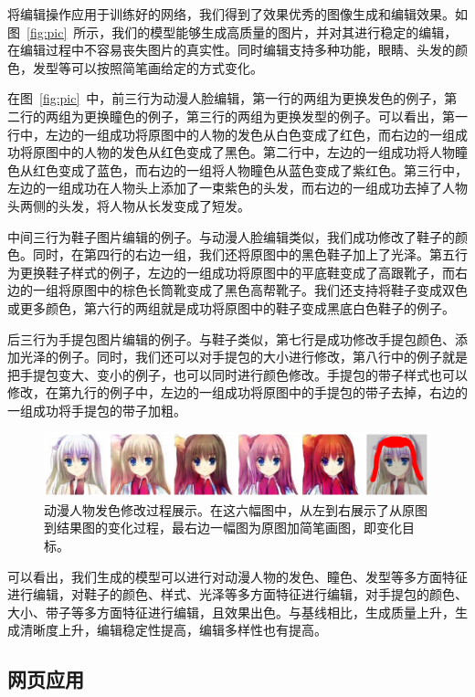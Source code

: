 \documentclass[a4paper,12pt,UTF8]{ctexart}
\newcommand{\kai}{\CJKfamily{zhkai}}	%
\begin{document}
将编辑操作应用于训练好的网络，我们得到了效果优秀的图像生成和编辑效果。如图~\ref{fig:pic}~所示，我们的模型能够生成高质量的图片，并对其进行稳定的编辑，在编辑过程中不容易丧失图片的真实性。同时编辑支持多种功能，眼睛、头发的颜色，发型等可以按照简笔画给定的方式变化。

在图~\ref{fig:pic}~中，前三行为动漫人脸编辑，第一行的两组为更换发色的例子，第二行的两组为更换瞳色的例子，第三行的两组为更换发型的例子。可以看出，第一行中，左边的一组成功将原图中的人物的发色从白色变成了红色，而右边的一组成功将原图中的人物的发色从红色变成了黑色。第二行中，左边的一组成功将人物瞳色从红色变成了蓝色，而右边的一组将人物瞳色从蓝色变成了紫红色。第三行中，左边的一组成功在人物头上添加了一束紫色的头发，而右边的一组成功去掉了人物头两侧的头发，将人物从长发变成了短发。

中间三行为鞋子图片编辑的例子。与动漫人脸编辑类似，我们成功修改了鞋子的颜色。同时，在第四行的右边一组，我们还将原图中的黑色鞋子加上了光泽。第五行为更换鞋子样式的例子，左边的一组成功将原图中的平底鞋变成了高跟靴子，而右边的一组将原图中的棕色长筒靴变成了黑色高帮靴子。我们还支持将鞋子变成双色或更多颜色，第六行的两组就是成功将原图中的鞋子变成黑底白色鞋子的例子。

后三行为手提包图片编辑的例子。与鞋子类似，第七行是成功修改手提包颜色、添加光泽的例子。同时，我们还可以对手提包的大小进行修改，第八行中的例子就是把手提包变大、变小的例子，也可以同时进行颜色修改。手提包的带子样式也可以修改，在第九行的例子中，左边的一组成功将原图中的手提包的带子去掉，右边的一组成功将手提包的带子加粗。

\begin{figure}[H]
  \centering
  \includegraphics[width=0.9\linewidth]{figs/pic6.png}
  \caption{\kai 动漫人物发色修改过程展示。在这六幅图中，从左到右展示了从原图到结果图的变化过程，最右边一幅图为原图加简笔画图，即变化目标。}
  \label{fig:pic6}
\end{figure}

可以看出，我们生成的模型可以进行对动漫人物的发色、瞳色、发型等多方面特征进行编辑，对鞋子的颜色、样式、光泽等多方面特征进行编辑，对手提包的颜色、大小、带子等多方面特征进行编辑，且效果出色。与基线相比，生成质量上升，生成清晰度上升，编辑稳定性提高，编辑多样性也有提高。

\subsection{网页应用}
\end{document}

